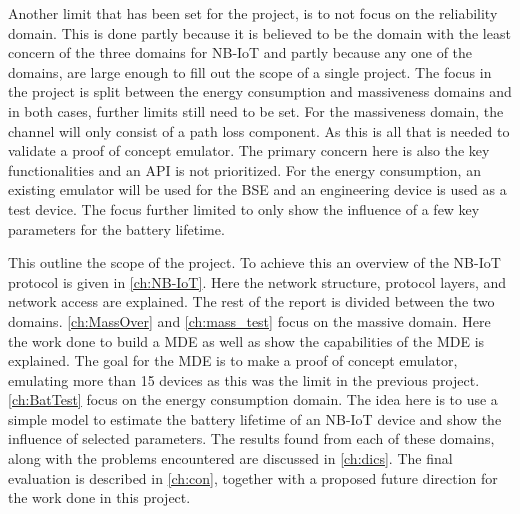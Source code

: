 Another limit that has been set for the project, is to not focus on the reliability domain. This is done partly because it is believed to be the domain with the least concern of the three domains for NB-IoT and partly because any one of the domains, are large enough to fill out the scope of a single project. The focus in the project is split between the energy consumption and massiveness domains and in both cases, further limits still need to be set. For the massiveness domain, the channel will only consist of a path loss component. As this is all that is needed to validate a proof of concept emulator. The primary concern here is also the key functionalities and an API is not prioritized. For the energy consumption, an existing emulator will be used for the BSE and an engineering device is used as a test device. The focus further limited to only show the influence of a few key parameters for the battery lifetime. %

This outline the scope of the project. To achieve this an overview of the \gls{NB-IoT} protocol is given in \autoref{ch:NB-IoT}. Here the network structure, protocol layers, and network access are explained. The rest of the report is divided between the two domains. \autoref{ch:MassOver} and \autoref{ch:mass_test} focus on the massive domain. Here the work done to build a \gls{MDE} as well as show the capabilities of the \gls{MDE} is explained. The goal for the MDE is to make a proof of concept emulator, emulating more than 15 devices as this was the limit in the previous project. \autoref{ch:BatTest} focus on the energy consumption domain. The idea here is to use a simple model to estimate the battery lifetime of an NB-IoT device and show the influence of selected parameters. The results found from each of these domains, along with the problems encountered are discussed in \autoref{ch:dics}. The final evaluation is described in \autoref{ch:con}, together with a proposed future direction for the work done in this project. 